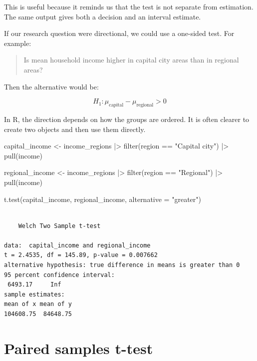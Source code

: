 \documentclass[
  letterpaper,
  DIV=11,
  numbers=noendperiod]{scrreprt}
\newenvironment{Shaded}{\begin{snugshade}}{\end{snugshade}}
\newcommand{\AttributeTok}[1]{\textcolor[rgb]{0.40,0.45,0.13}{#1}}
\newcommand{\FunctionTok}[1]{\textcolor[rgb]{0.28,0.35,0.67}{#1}}
\newcommand{\NormalTok}[1]{\textcolor[rgb]{0.00,0.23,0.31}{#1}}
\newcommand{\OtherTok}[1]{\textcolor[rgb]{0.00,0.23,0.31}{#1}}
\newcommand{\SpecialCharTok}[1]{\textcolor[rgb]{0.37,0.37,0.37}{#1}}
\newcommand{\StringTok}[1]{\textcolor[rgb]{0.13,0.47,0.30}{#1}}
\begin{document}
This is useful because it reminds us that the test is not separate from
estimation. The same output gives both a decision and an interval
estimate.

If our research question were directional, we could use a one-sided
test. For example:

\begin{quote}
Is mean household income higher in capital city areas than in regional
areas?
\end{quote}

Then the alternative would be:

\[
H_1: \mu_{\text{capital}} - \mu_{\text{regional}} > 0
\]

In R, the direction depends on how the groups are ordered. It is often
clearer to create two objects and then use them directly.

\begin{Shaded}
\begin{Highlighting}[]
\NormalTok{capital\_income }\OtherTok{\textless{}{-}}\NormalTok{ income\_regions }\SpecialCharTok{|\textgreater{}}
  \FunctionTok{filter}\NormalTok{(region }\SpecialCharTok{==} \StringTok{"Capital city"}\NormalTok{) }\SpecialCharTok{|\textgreater{}}
  \FunctionTok{pull}\NormalTok{(income)}

\NormalTok{regional\_income }\OtherTok{\textless{}{-}}\NormalTok{ income\_regions }\SpecialCharTok{|\textgreater{}}
  \FunctionTok{filter}\NormalTok{(region }\SpecialCharTok{==} \StringTok{"Regional"}\NormalTok{) }\SpecialCharTok{|\textgreater{}}
  \FunctionTok{pull}\NormalTok{(income)}

\FunctionTok{t.test}\NormalTok{(capital\_income, regional\_income, }\AttributeTok{alternative =} \StringTok{"greater"}\NormalTok{)}
\end{Highlighting}
\end{Shaded}

\begin{verbatim}

    Welch Two Sample t-test

data:  capital_income and regional_income
t = 2.4535, df = 145.89, p-value = 0.007662
alternative hypothesis: true difference in means is greater than 0
95 percent confidence interval:
 6493.17     Inf
sample estimates:
mean of x mean of y 
104608.75  84648.75 
\end{verbatim}

\section{Paired samples t-test}\label{paired-samples-t-test}
\end{document}
